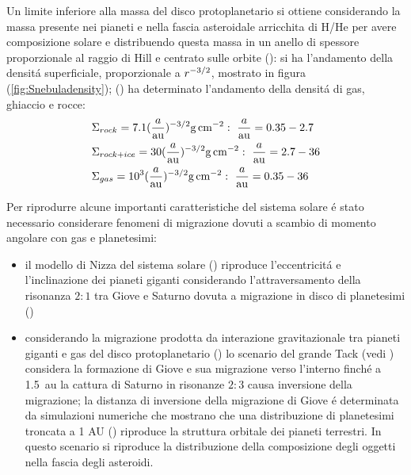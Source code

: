 Un limite inferiore alla massa del disco protoplanetario si ottiene  considerando la massa presente nei pianeti e nella fascia asteroidale arricchita di H/He per avere composizione solare e distribuendo questa massa in un anello di spessore proporzionale al raggio di Hill e centrato sulle orbite (\cite{weidenschilling1977distribution}): si ha l'andamento della densit\'a superficiale, proporzionale a $r^{-3/2}$, mostrato in figura (\ref{fig:Snebuladensity}); (\cite{hayashi1981structure}) ha determinato l'andamento della densit\'a di gas, ghiaccio e rocce:
\begin{align}
&\Sigma_{rock}=7.1(\frac{a}{\si{\astronomicalunit}})\expy{-3/2}\si{\gram\per\square\cm}:\ \frac{a}{\si{\astronomicalunit}}=0.35-2.7\\
&\Sigma_{rock+ice}=30(\frac{a}{\si{\astronomicalunit}})\expy{-3/2}\si{\gram\per\square\cm}:\ \frac{a}{\si{\astronomicalunit}}=2.7-36\\
&\Sigma_{gas}=\num{e3}(\frac{a}{\si{\astronomicalunit}})\expy{-3/2}\si{\gram\per\square\cm}:\ \frac{a}{\si{\astronomicalunit}}=0.35-36
\end{align}

Per riprodurre alcune importanti caratteristiche del sistema solare \'e stato necessario considerare fenomeni di migrazione dovuti a scambio di momento angolare con gas e planetesimi:
\begin{itemize}
	\item  il modello di Nizza del sistema solare (\cite{tsiganis2005origin}) riproduce l'eccentricit\'a e l'inclinazione dei pianeti giganti considerando l'attraversamento della risonanza $2:1$ tra Giove e Saturno dovuta a migrazione in disco di planetesimi (\cite{hahn1999orbital})
	\item considerando la migrazione prodotta da interazione gravitazionale tra pianeti giganti e gas del disco protoplanetario (\cite{lin1986tidal}) lo scenario del grande Tack (vedi \cite{walsh2011low}) considera la formazione di Giove e sua migrazione verso l'interno finch\'e a \SI{1.5}{\astronomicalunit} la cattura di Saturno in risonanze $2:3$ causa inversione della migrazione; la distanza di inversione della migrazione di Giove \'e determinata da simulazioni numeriche che mostrano che una distribuzione di planetesimi troncata a 1 AU (\cite{hansen2009formation}) riproduce la struttura orbitale dei pianeti terrestri. In questo scenario si riproduce la distribuzione della composizione degli oggetti nella fascia degli asteroidi.
\end{itemize}

